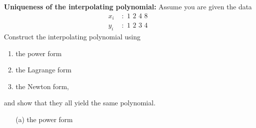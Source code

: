 \textbf{Uniqueness of the interpolating polynomial:} Assume you are
given the data
\[\begin{aligned}
x_i\;&: \,\, 1 \,\, 2 \,\, 4 \,\, 8 \\
y_i\;&: \,\, 1 \,\, 2 \,\, 3 \,\, 4
\end{aligned}\] Construct the interpolating polynomial using

\begin{enumerate}
\item the power form
\item the Lagrange form
\item the Newton form,
\end{enumerate}
and show that they all yield the same polynomial.

{\color{blue}

\begin{enumerate}
\item[(a) the power form]


\end{enumerate}}
